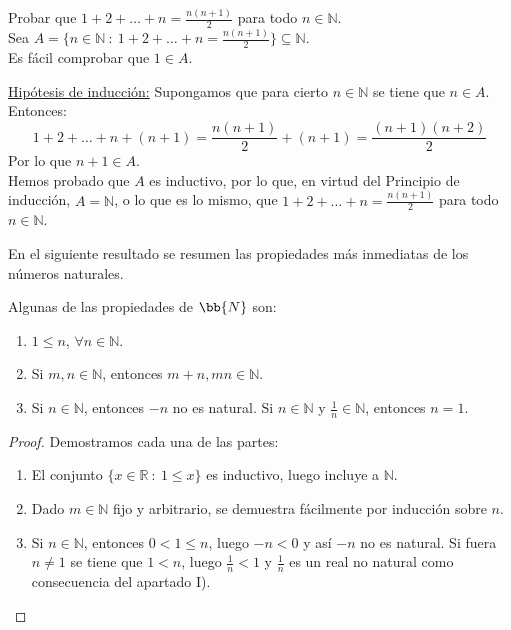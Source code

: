 \begin{ejemplo}
    Probar que $1+2+\dots+n=\frac{n(n+1)}{2}$ para todo $n \in \mathbb{N}$.\\
    
    Sea $A = \{n \in \mathbb{N}~:~1+2+\dots+n=\frac{n(n+1)}{2}\} \subseteq \mathbb{N}$.\\
    
    Es fácil comprobar que $1 \in A$.
    
    \underline{Hipótesis de inducción:} Supongamos que para cierto $n \in \mathbb{N}$ se tiene que $n \in A$.
    Entonces:
    \begin{equation*}
        1+2+\dots+n+(n+1)=\frac{n(n+1)}{2}+(n+1)=\frac{(n+1)(n+2)}{2}
    \end{equation*}
    Por lo que $n+1 \in A$.\\
    
    Hemos probado que $A$ es inductivo, por lo que, en virtud del Principio de inducción, $A = \mathbb{N}$, o lo que
    es lo mismo, que $1+2+\dots+n=\frac{n(n+1)}{2}$ para todo $n \in \mathbb{N}$.
\end{ejemplo}

\vspace{1em}
En el siguiente resultado se resumen las propiedades más inmediatas de los números naturales.
\begin{coro}\label{coro:2.1.5} Algunas de las propiedades de $\bb{N}$ son:
    \begin{enumerate}
        \item \label{coro:2.1.5_1} $1 \leq n$, $\forall n \in \mathbb{N}$.
        \item \label{coro:2.1.5_2} Si $m,n \in \mathbb{N}$, entonces $m+n,mn \in \mathbb{N}$.
        \item \label{coro:2.1.5_3} Si $n \in \mathbb{N}$, entonces $-n$ no es natural. Si $n \in \mathbb{N}$ y $\frac{1}{n} \in \mathbb{N}$, entonces $n = 1$.
    \end{enumerate}
\end{coro}

\begin{proof}
    Demostramos cada una de las partes:
    \begin{enumerate}
        \item El conjunto $\{x \in \mathbb{R}~:~ 1 \leq x\}$ es inductivo, luego incluye a $\mathbb{N}$.
        \item Dado $m \in \mathbb{N}$ fijo y arbitrario, se demuestra fácilmente por inducción sobre $n$.
        \item Si $n \in \mathbb{N}$, entonces $0 < 1 \leq n$, luego $-n < 0$ y así $-n$ no es natural.
        \newline
        Si fuera $n \neq 1$ se tiene que $1 < n$, luego $\frac{1}{n} < 1$ y $\frac{1}{n}$ es un real no natural como
        consecuencia del apartado I).
    \end{enumerate}
\end{proof}


